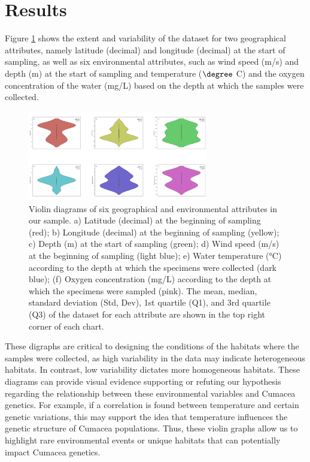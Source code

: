 \section{Results}\label{results}

Figure \ref{fig:fig1} shows the extent and variability of the dataset for two geographical attributes, namely latitude (decimal) and longitude (decimal) at the start of sampling, as well as six environmental attributes, such as wind speed (m/s) and depth (m) at the start of sampling and temperature ($\degree$ C) and the oxygen concentration of the water (mg/L) based on the depth at which the samples were collected.

\begin{figure}[]
    \centering
    \includegraphics[width=0.7\textwidth]{figure1.jpg}
    \caption{Violin diagrams of six geographical and environmental attributes in our sample. a) Latitude (decimal) at the beginning of sampling (red); b) Longitude (decimal) at the beginning of sampling (yellow); c) Depth (m) at the start of sampling (green); d) Wind speed (m/s) at the beginning of sampling (light blue); e) Water temperature (°C) according to the depth at which the specimens were collected (dark blue); (f) Oxygen concentration (mg/L) according to the depth at which the specimens were sampled (pink). The mean, median, standard deviation (Std, Dev), 1st quartile (Q1), and 3rd quartile (Q3) of the dataset for each attribute are shown in the top right corner of each chart. \label{fig:fig1}}
\end{figure}

These digraphs are critical to designing the conditions of the habitats where the samples were collected, as high variability in the data may indicate heterogeneous habitats. In contrast, low variability dictates more homogeneous habitats. These diagrams can provide visual evidence supporting or refuting our hypothesis regarding the relationship between these environmental variables and Cumacea genetics. For example, if a correlation is found between temperature and certain genetic variations, this may support the idea that temperature influences the genetic structure of Cumacea populations. Thus, these violin graphs allow us to highlight rare environmental events or unique habitats that can potentially impact Cumacea genetics. 

